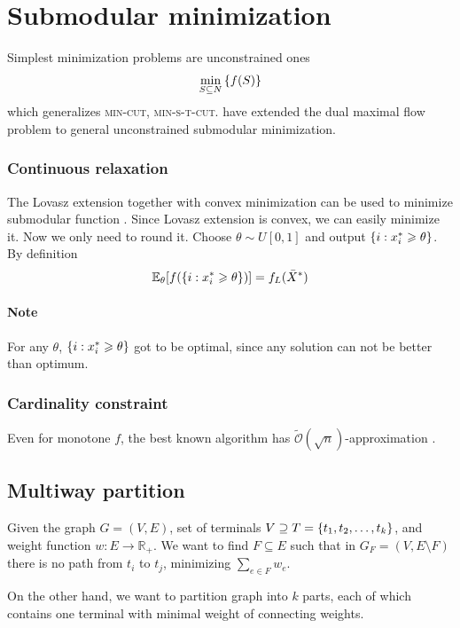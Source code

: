\section{Submodular minimization}
Simplest minimization problems are unconstrained ones
\begin{align}
\min\limits_{S\subseteq N} \qty{f(S)}
\end{align}
which generalizes \textsc{min-cut}, \textsc{min-s-t-cut}. \citet{iwata2001combinatorial} have extended the dual maximal flow problem to general unconstrained submodular minimization.

\subsubsection{Continuous relaxation}
The Lovasz extension together with convex minimization can be used to minimize submodular function \cite{grotschel1981ellipsoid}. Since Lovasz extension is convex, we can easily minimize it. Now we only need to round it. Choose $\theta \sim U[0,1]$ and output $\qty{i: x^*_i \geqslant \theta}$. By definition
\begin{align}
\mathbb{E}_\theta \qty[f\qty(\qty{i: x^*_i \geqslant \theta})] = f_L(\bar{X}^*)
\end{align}
\paragraph{Note}
For any $\theta$, $\qty{i: x^*_i \geqslant \theta}$ got to be optimal, since any solution can not be better than optimum.
\subsubsection{Cardinality constraint}
Even for monotone $f$, the best known algorithm has $\tilde{\mathcal{O}}(\sqrt{n})$-approximation \cite{svitkina2011submodular}.

\subsection{Multiway partition}
Given  the graph $G=(V,E)$, set of terminals $V\supseteq T = \qty{t_1, t_2, \dots, t_k}$, and weight function $w: E\to \mathbb{R}_+$. We want to find $F\subseteq E$ such that in $G_F = (V, E\setminus F)$ there is no path from $t_i$ to $t_j$, minimizing $\sum_{e\in F} w_e$.

On the other hand, we want to partition graph into $k$ parts, each of which contains one terminal with minimal weight of connecting weights.


